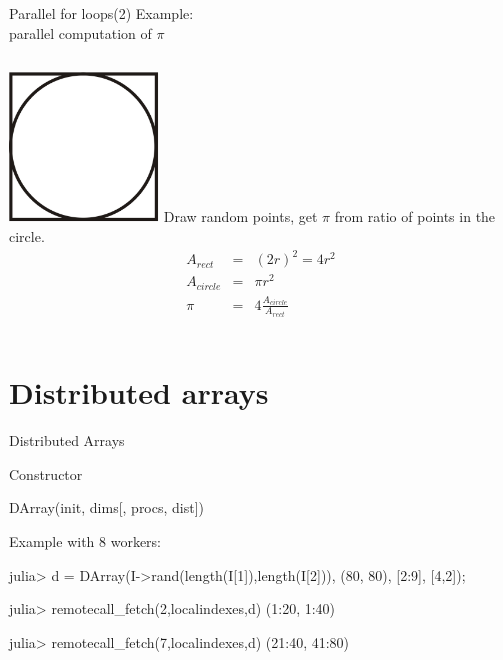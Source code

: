 \documentclass{beamer}
\begin{document}
	\begin{frame}{Parallel for loops(2)}
		Example: \\
		parallel computation of $\pi$
		\begin{columns}[c]
			\includegraphics[height=4cm]{figures/square_circle.jpg}
			Draw random points, get $\pi$ from ratio of points in the circle.
			\begin{equation*}
				\begin{array}{rcl}		
					A_{rect} & = & (2r)^2 = 4r^2 \\
					A_{circle} & = & \pi r^2 \\
					\pi & = & 4\frac{A_{circle}}{A_{rect}}
				\end{array}
			\end{equation*}
		\end{columns}
	\end{frame}

	\section{Distributed arrays}

	\begin{frame}[fragile]{Distributed Arrays}
		\begin{block}{Constructor}
		\begin{semiverbatim}
		DArray(init, dims[, procs, dist])
		\end{semiverbatim}
		\end{block}
		\begin{block}{Example with 8 workers:}
		\begin{semiverbatim}
		julia> d = DArray(I->rand(length(I[1]),length(I[2])),
											(80, 80), 
											[2:9], 
											[4,2]);	
		
		julia> remotecall\_fetch(2,localindexes,d)
		(1:20, 1:40)
		
		julia> remotecall\_fetch(7,localindexes,d)
		(21:40, 41:80)
		\end{semiverbatim}
		\end{block}
	\end{frame}
\end{document}
